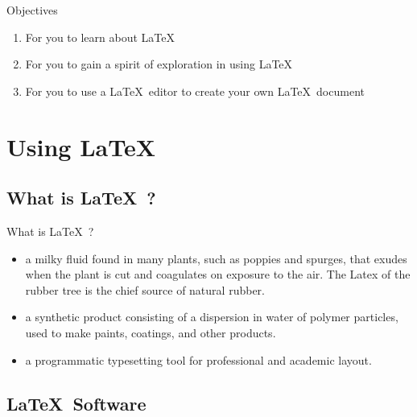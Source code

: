 \documentclass{beamer}
\begin{document}
\begin{frame}{Objectives}
	\begin{enumerate}
		\item For you to learn about \LaTeX\
		\item For you to gain a spirit of exploration in using \LaTeX
		\item For you to use a \LaTeX\ editor to create your own \LaTeX\ document
	\end{enumerate}
\end{frame}

\section{Using \LaTeX}

\subsection[What is \LaTeX\ ?]{What is \LaTeX\ ?}

\begin{frame}{What is \LaTeX\ ?}
	\begin{itemize}
		\item a milky fluid found in many plants, such as poppies and spurges, that exudes when the plant is cut and coagulates on exposure to the air. The Latex of the rubber tree is the chief source of natural rubber.
			\pause
		\item a synthetic product consisting of a dispersion in water of polymer particles, used to make paints, coatings, and other products.
			\pause
		\item a programmatic typesetting tool for professional and academic layout. 
	\end{itemize}	
\end{frame}

\subsection[\LaTeX\ Software]{\LaTeX\ Software}
\end{document}
